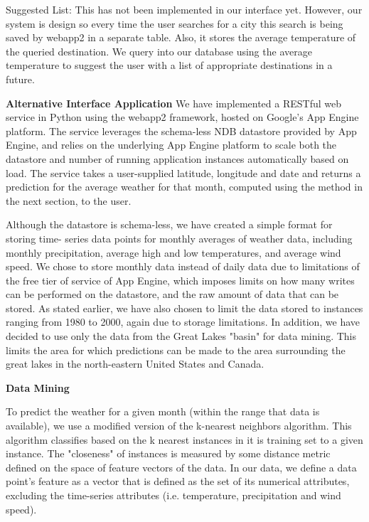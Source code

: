 \documentclass{sig-alternate}
\begin{document}
			Suggested List:\newline
				This has not been implemented in our interface yet. However, our system is design so 						every time the user searches for a city this search is being saved by webapp2 in a 						separate table. Also, it stores the average temperature of the queried destination.  We 					query into our database using the average temperature to suggest the user with a list of 				appropriate destinations in a future. \newline	

		\textbf{Alternative Interface Application}\newline
			We have implemented a RESTful web service in Python using the webapp2 framework, hosted on 				Google's App Engine platform. The service leverages the schema-less NDB datastore provided 				by App Engine, and relies on the underlying App Engine platform to scale both the datastore 				and number of running application instances automatically based on load. The service takes a 			user-supplied latitude, longitude and date and returns a prediction for the average weather 				for that month, computed using the method in the next section, to the user.\newline

			Although the datastore is schema-less, we have created a simple format for storing time-					series data points for monthly averages of weather data, including monthly precipitation, 				average high and low temperatures, and average wind speed. We chose to store monthly data 				instead of daily data due to limitations of the free tier of service of App Engine, which 				imposes limits on how many writes can be performed on the datastore, and the raw amount of 				data that can be stored. As stated earlier, we have also chosen to limit the data stored to 				instances ranging from 1980 to 2000, again due to storage limitations. In addition, we have 				decided to use only the data from the Great Lakes "basin" for data mining. This limits the 				area for which predictions can be made to the area surrounding the great lakes in the 					north-eastern United States and Canada.\newline

		\textbf{Data Mining}\newline

			To predict the weather for a given month (within the range that data is available), we use a 			modified version of the k-nearest neighbors algorithm. This algorithm classifies based on 				the k nearest instances in it is training set to a given instance. The "closeness" of 					instances is measured by some distance metric defined on the space of feature vectors of the 			data. In our data, we define a data point's feature as a vector that is defined as the set 				of its numerical attributes, excluding the time-series attributes (i.e. temperature, 						precipitation and wind speed).\newline
\end{document}
